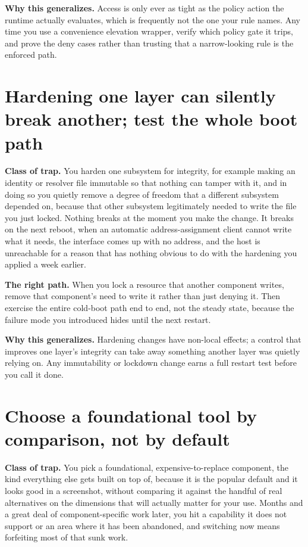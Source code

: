 \documentclass[12pt]{article}
\begin{document}
\textbf{Why this generalizes.} Access is only ever as tight as the policy action the runtime actually evaluates, which is frequently not the one your rule names. Any time you use a convenience elevation wrapper, verify which policy gate it trips, and prove the deny cases rather than trusting that a narrow-looking rule is the enforced path.

\section{Hardening one layer can silently break another; test the whole boot path}

\textbf{Class of trap.} You harden one subsystem for integrity, for example making an identity or resolver file immutable so that nothing can tamper with it, and in doing so you quietly remove a degree of freedom that a different subsystem depended on, because that other subsystem legitimately needed to write the file you just locked. Nothing breaks at the moment you make the change. It breaks on the next reboot, when an automatic address-assignment client cannot write what it needs, the interface comes up with no address, and the host is unreachable for a reason that has nothing obvious to do with the hardening you applied a week earlier.

\textbf{The right path.} When you lock a resource that another component writes, remove that component's need to write it rather than just denying it. Then exercise the entire cold-boot path end to end, not the steady state, because the failure mode you introduced hides until the next restart.

\textbf{Why this generalizes.} Hardening changes have non-local effects; a control that improves one layer's integrity can take away something another layer was quietly relying on. Any immutability or lockdown change earns a full restart test before you call it done.

\section{Choose a foundational tool by comparison, not by default}

\textbf{Class of trap.} You pick a foundational, expensive-to-replace component, the kind everything else gets built on top of, because it is the popular default and it looks good in a screenshot, without comparing it against the handful of real alternatives on the dimensions that will actually matter for your use. Months and a great deal of component-specific work later, you hit a capability it does not support or an area where it has been abandoned, and switching now means forfeiting most of that sunk work.
\end{document}
